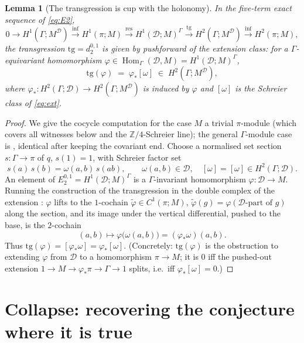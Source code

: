 \documentclass[11pt]{article}
\newtheorem{lemma}[theorem]{Lemma}
\theoremstyle{definition}
\newcommand{\Hom}{\operatorname{Hom}}
\newcommand{\D}{\mathcal{D}}
\newcommand{\Z}{\mathbb{Z}}
\newcommand{\infl}{\mathrm{inf}}
\newcommand{\res}{\mathrm{res}}
\newcommand{\tg}{\mathrm{tg}}
\begin{document}
\begin{lemma}[The transgression is cup with the holonomy]\label{lem:tg}
In the five-term exact sequence of \eqref{eq:E2},
\[
   0\to H^1(\Gamma;M^\D)\xrightarrow{\infl}H^1(\pi;M)\xrightarrow{\res}
   H^1(\D;M)^\Gamma\xrightarrow{\ \tg\ }H^2(\Gamma;M^\D)\xrightarrow{\infl}H^2(\pi;M),
\]
the transgression $\tg=d_2^{0,1}$ is given by pushforward of the extension class:
for a $\Gamma$-equivariant homomorphism $\varphi\in\Hom_\Gamma(\D,M)=H^1(\D;M)^\Gamma$,
\[
   \tg(\varphi)\;=\;\varphi_*[\omega]\;\in\;H^2(\Gamma;M^\D),
\]
where $\varphi_*\colon H^2(\Gamma;\D)\to H^2(\Gamma;M^\D)$ is induced by $\varphi$
and $[\omega]$ is the Schreier class of \eqref{eq:ext}.
\end{lemma}
\begin{proof}
We give the cocycle computation for the case $M$ a trivial $\pi$-module (which
covers all witnesses below and the $\Z/4$-Schreier line); the general
$\Gamma$-module case is \cite[proof of the transgression formula]{nsw}, identical
after keeping the covariant end. Choose a normalised set section
$s\colon\Gamma\to\pi$ of $q$, $s(1)=1$, with Schreier factor set
\[
   s(a)\,s(b)=\omega(a,b)\,s(ab),\qquad \omega(a,b)\in\D,\quad [\omega]=[\omega]\in H^2(\Gamma;\D).
\]
An element of $E_2^{0,1}=H^1(\D;M)^\Gamma$ is a $\Gamma$-invariant homomorphism
$\varphi\colon\D\to M$. Running the construction of the transgression in the
double complex of the extension \cite[\S6.8]{weibel}: $\varphi$ lifts to the
$1$-cochain $\tilde\varphi\in C^1(\pi;M)$, $\tilde\varphi(g)=\varphi(\text{$\D$-part of }g)$
along the section, and its image under the vertical differential, pushed to the
base, is the $2$-cochain
\[
   (a,b)\longmapsto \varphi\bigl(\omega(a,b)\bigr)=(\varphi_*\omega)(a,b).
\]
Thus $\tg(\varphi)=[\varphi_*\omega]=\varphi_*[\omega]$. (Concretely: $\tg(\varphi)$
is the obstruction to extending $\varphi$ from $\D$ to a homomorphism
$\pi\to M$; it is $0$ iff the pushed-out extension
$1\to M\to\varphi_*\pi\to\Gamma\to1$ splits, i.e.\ iff $\varphi_*[\omega]=0$.)
\end{proof}

\section{Collapse: recovering the conjecture where it is true}
\end{document}

